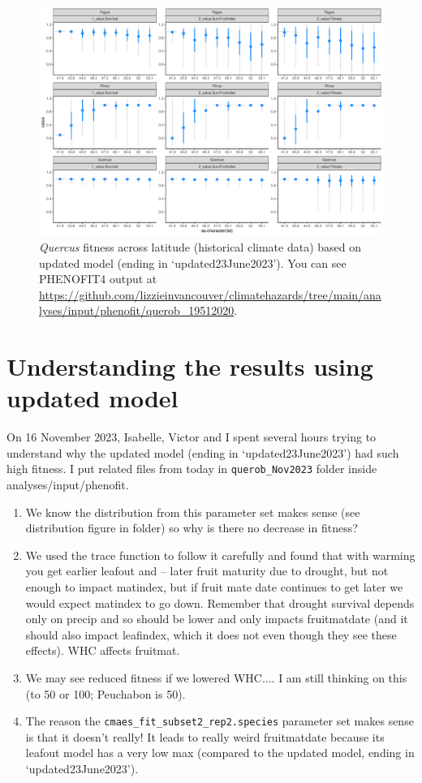 \documentclass[11pt,letter]{article}
\begin{document}
\begin{figure}[h!]
 \begin{center}
\noindent \includegraphics[width=1\textwidth]{..//analyses/graphs/phenofit/historical/fitnessBuildup.pdf}
  \caption{\emph{Quercus} fitness across latitude (historical climate data) based on updated model (ending in `updated23June2023'). You can see PHENOFIT4 output at \url{https://github.com/lizzieinvancouver/climatehazards/tree/main/analyses/input/phenofit/querob_19512020}.}
  \label{fig:histdnew}
  \end{center}
\end{figure}


\section*{Understanding the results using updated model}

On 16 November 2023, Isabelle, Victor and I spent several hours trying to understand why the updated model (ending in `updated23June2023') had such high fitness. I put related files from today in \verb|querob_Nov2023| folder inside analyses/input/phenofit. 

\begin{enumerate}
\item We know the distribution from this parameter set makes sense (see distribution figure in folder) so why is there no decrease in fitness?
\item We used the trace function to follow it carefully and found that with warming you get earlier leafout and -- later fruit maturity due to drought, but not enough to impact matindex, but if fruit mate date continues to get later we would expect matindex to go down. Remember that drought survival depends only on precip and so should be lower and only impacts fruitmatdate (and it should also impact leafindex, which it does not even though they see these effects). WHC affects fruitmat.
\item We may see reduced fitness if we lowered WHC.... I am still thinking on this (to 50 or 100; Peuchabon is 50). 
\item The reason the \verb|cmaes_fit_subset2_rep2.species| parameter set makes sense is that it doesn't really! It leads to really weird fruitmatdate because its leafout model has a very low max (compared to the updated model, ending in `updated23June2023'). 
\end{enumerate}
\end{document}

